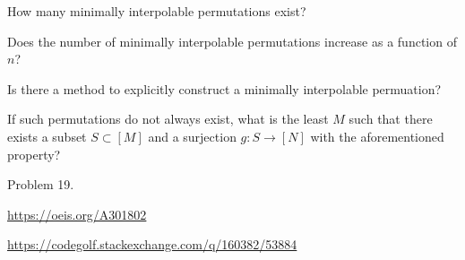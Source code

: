 \documentclass{article}
\begin{document}
\begin{related}
  \item How many minimally interpolable permutations exist?
  \item Does the number of minimally interpolable permutations increase as a
    function of $n$?
  \item Is there a method to explicitly construct a minimally interpolable
    permuation?
  \item If such permutations do not always exist, what is the least $M$ such
    that there exists a subset $S \subset [M]$ and a surjection
    $g\colon S\rightarrow [N]$ with the aforementioned property?
\end{related}
\begin{references}
  \item Problem 19.
  \item \url{https://oeis.org/A301802}
  \item \url{https://codegolf.stackexchange.com/q/160382/53884}
\end{references}
\end{document}
